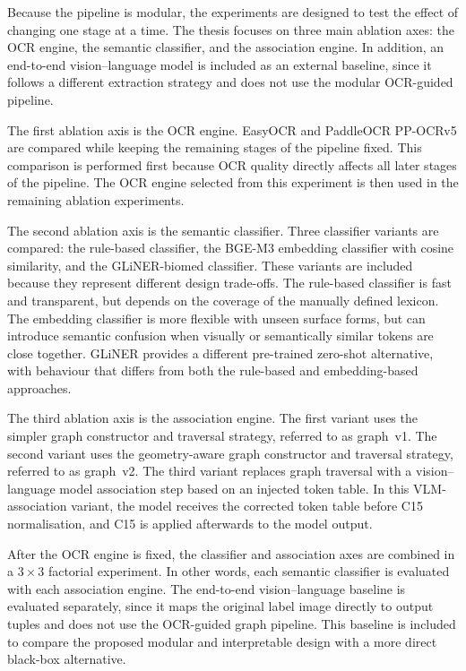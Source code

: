 Because the pipeline is modular, the experiments are designed to test the effect of changing one stage at a time. The thesis focuses on three main ablation axes: the OCR engine, the semantic classifier, and the association engine. In addition, an end-to-end vision--language model is included as an external baseline, since it follows a different extraction strategy and does not use the modular OCR-guided pipeline.

The first ablation axis is the OCR engine. EasyOCR and PaddleOCR PP-OCRv5 are compared while keeping the remaining stages of the pipeline fixed. This comparison is performed first because OCR quality directly affects all later stages of the pipeline. The OCR engine selected from this experiment is then used in the remaining ablation experiments.

The second ablation axis is the semantic classifier. Three classifier variants are compared: the rule-based classifier, the BGE-M3 embedding classifier with cosine similarity, and the GLiNER-biomed classifier. These variants are included because they represent different design trade-offs. The rule-based classifier is fast and transparent, but depends on the coverage of the manually defined lexicon. The embedding classifier is more flexible with unseen surface forms, but can introduce semantic confusion when visually or semantically similar tokens are close together. GLiNER provides a different pre-trained zero-shot alternative, with behaviour that differs from both the rule-based and embedding-based approaches.

The third ablation axis is the association engine. The first variant uses the simpler graph constructor and traversal strategy, referred to as graph~v1. The second variant uses the geometry-aware graph constructor and traversal strategy, referred to as graph~v2. The third variant replaces graph traversal with a vision--language model association step based on an injected token table. In this VLM-association variant, the model receives the corrected token table before C15 normalisation, and C15 is applied afterwards to the model output.

After the OCR engine is fixed, the classifier and association axes are combined in a \(3 \times 3\) factorial experiment. In other words, each semantic classifier is evaluated with each association engine. The end-to-end vision--language baseline is evaluated separately, since it maps the original label image directly to output tuples and does not use the OCR-guided graph pipeline. This baseline is included to compare the proposed modular and interpretable design with a more direct black-box alternative.

